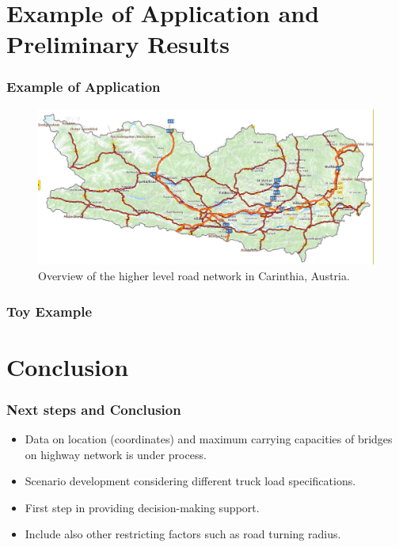 \documentclass{beamer}   %
\theoremstyle{break}
\begin{document}
  \section[Example of Application] {Example of Application and Preliminary Results}
  \begin{frame}
    \frametitle{Example of Application}
    \begin{figure}[!ht]
      \centering
      \includegraphics[width=1.0\textwidth]{../manuscript/figures/map.jpg}
      \caption{Overview of the higher level road network in Carinthia, Austria.}
      \label{fig:higher level}
    \end{figure}
  \end{frame}





  \begin{frame}
    \frametitle{Toy Example}
    \begin{figure}[!ht]
      \centering
      \scalebox{0.5}{
      
      }
    \end{figure}
  \end{frame}


  \section[Next Steps and Conclusion] {Conclusion}

  \begin{frame}
    \frametitle{Next steps and Conclusion}
    \begin{itemize}
      \item Data on location (coordinates) and maximum carrying capacities of bridges on highway network is under process.
      \item Scenario development considering different truck load specifications.
	\item First step in providing decision-making support. 
	\item Include also other restricting factors such as road turning radius. 
    \end{itemize}

  \end{frame}
\end{document}
